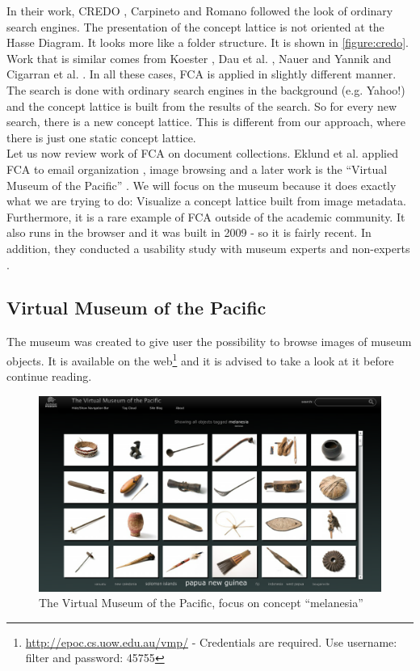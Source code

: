 \documentclass[11pt]{report}
\begin{document}
In their work, CREDO \cite{Carpineto2004}, Carpineto and Romano followed the look of ordinary search engines. The presentation of the concept lattice is not oriented at the Hasse Diagram. It looks more like a folder structure. It is shown in \ref{figure:credo}. Work that is similar comes from Koester \cite{Koester2006}, Dau et al. \cite{Dau2008}, Nauer and Yannik \cite{Nauer2009} and Cigarran et al. \cite{Cigarran2004}. In all these cases, FCA is applied in slightly different manner. The search is done with ordinary search engines in the background (e.g. Yahoo!) and the concept lattice is built from the results of the search. So for every new search, there is a new concept lattice. This is different from our approach, where there is just one static concept lattice. \\

Let us now review work of FCA on document collections. Eklund et al. applied FCA to email organization \cite{Eklund2004}, image browsing \cite{Ducrou2006,Ducrou2008} and a later work is the ``Virtual Museum of the Pacific'' \cite{Eklund2009,Eklund2012}. We will focus on the museum because it does exactly what we are trying to do: Visualize a concept lattice built from image metadata. Furthermore, it is a rare example of FCA outside of the academic community. It also runs in the browser and it was built in 2009 - so it is fairly recent. In addition, they conducted a usability study with museum experts and non-experts \cite{Eklund2012}.

\subsection{Virtual Museum of the Pacific}
\label{Museum}
 
The museum was created to give user the possibility to browse images of museum objects. It is available on the web\footnote{\url{http://epoc.cs.uow.edu.au/vmp/} - Credentials are required. Use username: filter and password: 45755} and it is advised to take a look at it before continue reading. \\

\begin{figure}[!ht]
	\centering
	\includegraphics[width=\linewidth]{images/pacific}
\caption{The Virtual Museum of the Pacific, focus on concept ``melanesia''}
\label{figure:pacific}
\end{figure}
\end{document}
